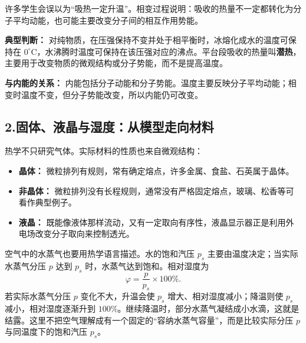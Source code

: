 许多学生会误以为“吸热一定升温”。相变过程说明：吸收的热量不一定都转化为分子平均动能，也可能主要改变分子间的相互作用势能。

\begin{center}


\label{fig:phase-change-heating-curve}
\end{center}

\textbf{典型判断：} 对纯物质，在压强保持不变并处于相平衡时，冰熔化成水的温度可保持在 $0^\circ\mathrm{C}$，水沸腾时温度可保持在该压强对应的沸点。平台段吸收的热量叫\textbf{潜热}，主要用于改变物质的微观结构或分子势能，而不是提高温度。

\textbf{与内能的关系：} 内能包括分子动能和分子势能。温度主要反映分子平均动能；相变时温度不变，但分子势能改变，所以内能仍可改变。

\subsection*{2.\quad 固体、液晶与湿度：从模型走向材料}

热学不只研究气体。实际材料的性质也来自微观结构：
\begin{itemize}
  \item \textbf{晶体：} 微粒排列有规则，常有确定熔点，许多金属、食盐、石英属于晶体。
  \item \textbf{非晶体：} 微粒排列没有长程规则，通常没有严格固定熔点，玻璃、松香等可看作典型例子。
  \item \textbf{液晶：} 既能像液体那样流动，又有一定取向有序性，液晶显示器正是利用外电场改变分子取向来控制透光。
\end{itemize}

空气中的水蒸气也要用热学语言描述。水的饱和汽压 $p_s$ 主要由温度决定；当实际水蒸气分压 $p$ 达到 $p_s$ 时，水蒸气达到饱和。相对湿度为
\[
\varphi=\frac{p}{p_s}\times100\%.
\]
若实际水蒸气分压 $p$ 变化不大，升温会使 $p_s$ 增大、相对湿度减小；降温则使 $p_s$ 减小，相对湿度逐渐升到 $100\%$。继续降温时，部分水蒸气凝结成小水滴，这就是结露。这里不把空气理解成有一个固定的“容纳水蒸气容量”，而是比较实际分压 $p$ 与同温度下的饱和汽压 $p_s$。

\begin{center}


\label{fig:materials-humidity}
\end{center}

